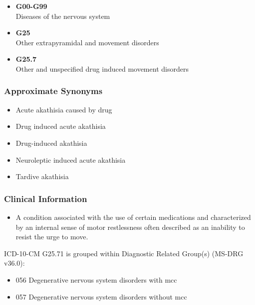 \begin{paracol}{2}
\begin{leftcolumn}
\begin{itemize}
\tightlist
\item
  \textbf{G00-G99}\\
  Diseases of the nervous system
\item
  \textbf{G25}\\
  Other extrapyramidal and movement disorders
\item
  \textbf{G25.7}\\
  Other and unspecified drug induced movement disorders
\end{itemize}

\hypertarget{approximate-synonyms-1}{%
\subsubsection{Approximate Synonyms}\label{approximate-synonyms-1}}

\begin{itemize}
\tightlist
\item
  Acute akathisia caused by drug
\item
  Drug induced acute akathisia
\item
  Drug-induced akathisia
\item
  Neuroleptic induced acute akathisia
\item
  Tardive akathisia
\end{itemize}

\hypertarget{clinical-information}{%
\subsubsection{Clinical Information}\label{clinical-information}}

\begin{itemize}
\tightlist
\item
  A condition associated with the use of certain medications and characterized by an internal sense of motor restlessness often described as an inability to resist the urge to move.
\end{itemize}

\noindent ICD-10-CM G25.71 is grouped within Diagnostic Related Group(s) (MS-DRG v36.0):

\begin{itemize}
\tightlist
\item
  056 Degenerative nervous system disorders with mcc
\item
  057 Degenerative nervous system disorders without mcc
\end{itemize}


\end{leftcolumn}
\end{paracol}
